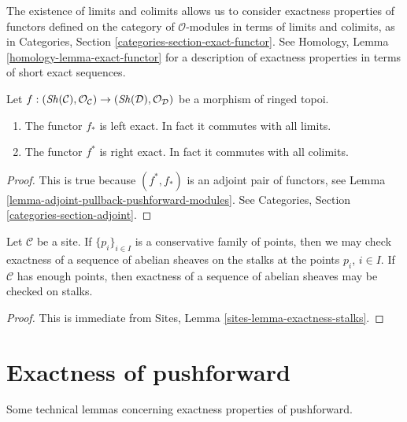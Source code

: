 \noindent
The existence of limits and colimits allows us to consider exactness
properties of functors defined on the category of $\mathcal{O}$-modules
in terms of limits and colimits, as in
Categories, Section \ref{categories-section-exact-functor}.
See Homology, Lemma \ref{homology-lemma-exact-functor} for a description of
exactness properties in terms of short exact sequences.

\begin{lemma}
\label{lemma-exactness-pushforward-pullback}
Let $f : (\mathop{\mathit{Sh}}\nolimits(\mathcal{C}), \mathcal{O}_\mathcal{C})
\to (\mathop{\mathit{Sh}}\nolimits(\mathcal{D}), \mathcal{O}_\mathcal{D})$
be a morphism of ringed topoi.
\begin{enumerate}
\item The functor $f_*$ is left exact. In fact it commutes with
all limits.
\item The functor $f^*$ is right exact. In fact it commutes
with all colimits.
\end{enumerate}
\end{lemma}

\begin{proof}
This is true because $(f^*, f_*)$ is an adjoint pair
of functors, see
Lemma \ref{lemma-adjoint-pullback-pushforward-modules}.
See Categories, Section \ref{categories-section-adjoint}.
\end{proof}

\begin{lemma}
\label{lemma-check-exactness-stalks}
Let $\mathcal{C}$ be a site. If $\{p_i\}_{i \in I}$ is a conservative
family of points, then we may check exactness of a sequence of abelian
sheaves on the stalks at the points $p_i$, $i \in I$.
If $\mathcal{C}$ has enough points, then
exactness of a sequence of abelian sheaves may
be checked on stalks.
\end{lemma}

\begin{proof}
This is immediate from
Sites, Lemma \ref{sites-lemma-exactness-stalks}.
\end{proof}





\section{Exactness of pushforward}
\label{section-pushforward}

\noindent
Some technical lemmas concerning exactness properties of pushforward.

